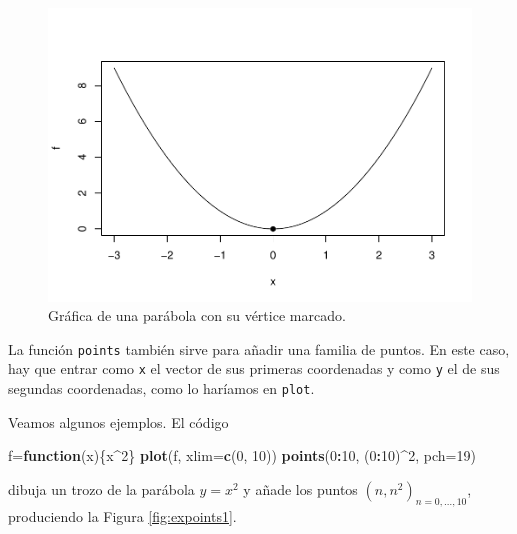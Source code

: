 \documentclass[
]{book}
\newenvironment{Shaded}{\begin{snugshade}}{\end{snugshade}}
\newcommand{\ControlFlowTok}[1]{\textcolor[rgb]{0.13,0.29,0.53}{\textbf{#1}}}
\newcommand{\DataTypeTok}[1]{\textcolor[rgb]{0.13,0.29,0.53}{#1}}
\newcommand{\DecValTok}[1]{\textcolor[rgb]{0.00,0.00,0.81}{#1}}
\newcommand{\KeywordTok}[1]{\textcolor[rgb]{0.13,0.29,0.53}{\textbf{#1}}}
\newcommand{\NormalTok}[1]{#1}
\newcommand{\OperatorTok}[1]{\textcolor[rgb]{0.81,0.36,0.00}{\textbf{#1}}}
\theoremstyle{definition}
\theoremstyle{definition}
\theoremstyle{definition}
\theoremstyle{remark}
\begin{document}
\begin{figure}

{\centering \includegraphics[width=0.9\linewidth]{07chap06_Graficos_I_files/figure-latex/ex1punt-1} 

}

\caption{Gráfica de una parábola con su vértice marcado.}\label{fig:ex1punt}
\end{figure}

La función \texttt{points} también sirve para añadir una familia de puntos. En
este caso, hay que entrar como \texttt{x} el vector de sus primeras coordenadas y como \texttt{y} el de sus segundas coordenadas, como lo haríamos en \texttt{plot}.

Veamos algunos ejemplos. El código

\begin{Shaded}
\begin{Highlighting}[]
\NormalTok{f=}\ControlFlowTok{function}\NormalTok{(x)\{x}\OperatorTok{\^{}}\DecValTok{2}\NormalTok{\}}
\KeywordTok{plot}\NormalTok{(f, }\DataTypeTok{xlim=}\KeywordTok{c}\NormalTok{(}\DecValTok{0}\NormalTok{, }\DecValTok{10}\NormalTok{))}
\KeywordTok{points}\NormalTok{(}\DecValTok{0}\OperatorTok{:}\DecValTok{10}\NormalTok{, (}\DecValTok{0}\OperatorTok{:}\DecValTok{10}\NormalTok{)}\OperatorTok{\^{}}\DecValTok{2}\NormalTok{, }\DataTypeTok{pch=}\DecValTok{19}\NormalTok{)}
\end{Highlighting}
\end{Shaded}

dibuja un trozo de la parábola \(y=x^2\) y añade los puntos
\((n, n^2)_{n=0, \ldots, 10}\), produciendo la Figura \ref{fig:expoints1}.
\end{document}
